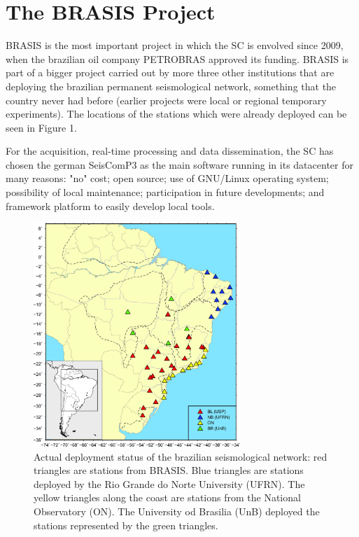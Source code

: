 \documentclass[twoside,letterpaper,twocolumn]{article}
\begin{document}
\section{The BRASIS Project}

BRASIS is the most important project in which the SC is envolved since 2009, when the brazilian oil company PETROBRAS approved its funding. BRASIS is part of a bigger project carried out by more three other institutions that are deploying the brazilian permanent seismological network, something that the country never had before (earlier projects were local or regional temporary experiments). The locations of the stations which were already deployed can be seen in Figure 1. 

For the acquisition, real-time processing and data dissemination, the SC has chosen the german SeisComP3 as the main software running in its datacenter for many reasons: "no" cost; open source; use of GNU/Linux operating system; possibility of local maintenance; participation in future developments; and framework platform to easily develop local tools.

\begin{figure}[h!]
\centering
\includegraphics[width=7.8cm]{images/rsb.jpg}
\caption[Figure 1]{Actual deployment status of the brazilian seismological network: red triangles are stations from BRASIS. Blue triangles are stations deployed by the Rio Grande do Norte University (UFRN). The yellow triangles along the coast are stations from the National Observatory (ON). The University od Brasilia (UnB) deployed the stations represented by the green triangles. }
\end{figure}
\end{document}
